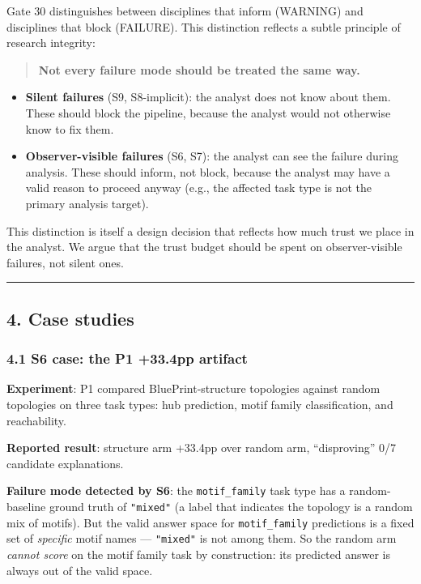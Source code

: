\documentclass[
]{article}
\providecommand{\tightlist}{%
  \setlength{\itemsep}{0pt}\setlength{\parskip}{0pt}}
\begin{document}
Gate 30 distinguishes between disciplines that inform (WARNING) and
disciplines that block (FAILURE). This distinction reflects a subtle
principle of research integrity:

\begin{quote}
\textbf{Not every failure mode should be treated the same way.}
\end{quote}

\begin{itemize}
\tightlist
\item
  \textbf{Silent failures} (S9, S8-implicit): the analyst does not know
  about them. These should block the pipeline, because the analyst would
  not otherwise know to fix them.
\item
  \textbf{Observer-visible failures} (S6, S7): the analyst can see the
  failure during analysis. These should inform, not block, because the
  analyst may have a valid reason to proceed anyway (e.g., the affected
  task type is not the primary analysis target).
\end{itemize}

This distinction is itself a design decision that reflects how much
trust we place in the analyst. We argue that the trust budget should be
spent on observer-visible failures, not silent ones.

\begin{center}\rule{0.5\linewidth}{0.5pt}\end{center}

\subsection{4. Case studies}\label{case-studies}

\subsubsection{4.1 S6 case: the P1 +33.4pp
artifact}\label{s6-case-the-p1-33.4pp-artifact}

\textbf{Experiment}: P1 compared BluePrint-structure topologies against
random topologies on three task types: hub prediction, motif family
classification, and reachability.

\textbf{Reported result}: structure arm +33.4pp over random arm,
``disproving'' 0/7 candidate explanations.

\textbf{Failure mode detected by S6}: the \texttt{motif\_family} task
type has a random-baseline ground truth of \texttt{"mixed"} (a label
that indicates the topology is a random mix of motifs). But the valid
answer space for \texttt{motif\_family} predictions is a fixed set of
\emph{specific} motif names --- \texttt{"mixed"} is not among them. So
the random arm \emph{cannot score} on the motif family task by
construction: its predicted answer is always out of the valid space.
\end{document}
